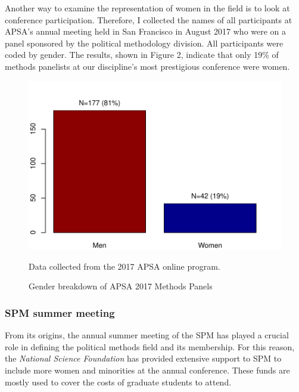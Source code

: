 \documentclass[12pt]{texMemo}
\begin{document}
Another way to examine the representation of women in the field is to look at conference participation.  Therefore, I collected the names of all participants at APSA's annual meeting held in San Francisco in August 2017 who were on a panel sponsored by the political methodology division.  All participants were coded by gender.  The results, shown in Figure 2, indicate that only 19\% of methods panelists at our discipline's most prestigious conference were women.
\begin{figure}[htbp]
\caption{Gender breakdown of APSA 2017 Methods Panels}
\begin{center}
\includegraphics[scale=.6]{apsaGender}
\end{center}


\footnotesize Data collected from the 2017 APSA online program.
\end{figure}

\subsubsection*{SPM summer meeting}

From its origins, the annual summer meeting of the SPM has played a crucial role in defining the political methods field and its membership.  For this reason, the \textit{National Science Foundation} has provided extensive support to SPM to include more women and minorities at the annual conference.  These funds are mostly used to cover the costs of graduate students to attend.
\end{document}
